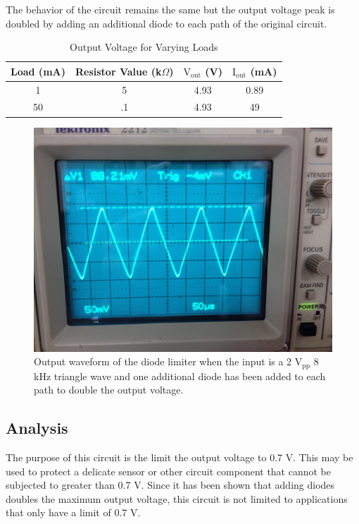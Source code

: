 \documentclass[12pt,letterpaper]{report}
\newlength \figwidth
\begin{document}
The behavior of the circuit remains the same but the output voltage peak is doubled by adding an additional diode to each path of the original circuit.

\begin{table}[ht]
\caption{Output Voltage for Varying Loads} %
\centering 
    \begin{tabular}{| c | c | c | c |}
    \hline  
    Load (mA) & Resistor Value (k$\Omega$) & $\text{V}_{\text{out}}$ (V) & $ \text{I}_{\text{out}}$ (mA)\\
    \hline
    1 & 5 & 4.93 & 0.89 \\
    50 &.1 & 4.93 & 49 \\
    \hline
    \end{tabular}
    \label{table:voltage_out}
\end{table}

\begin{figure}[H]
\centering
\includegraphics[width=\figwidth, keepaspectratio=true]{lab4/3_7_4.jpg}
\caption{Output waveform of the diode limiter when the input is a 2 $\text{V}_{\text{pp}}$ 8 kHz triangle wave and one additional diode has been added to each path to double the output voltage.}
\label{fig:3_7_4}
\end{figure}

\subsection*{Analysis}

The purpose of this circuit is the limit the output voltage to 0.7 V. This may be used to protect a delicate sensor or other circuit component that cannot be subjected to greater than 0.7 V. Since it has been shown that adding diodes doubles the maximum output voltage, this circuit is not limited to applications that only have a limit of 0.7 V.
\end{document}
